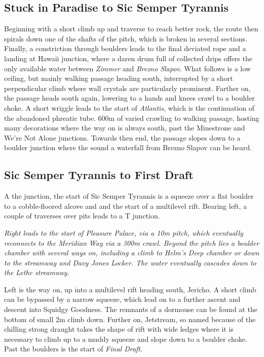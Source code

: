 \subsection{Stuck in Paradise to Sic Semper Tyrannis}
Beginning with a short climb up and traverse to reach better rock, the route then spirals down one of the shafts of the pitch, which is broken in several sections. Finally, a constriction through boulders leads to the final deviated rope and a landing at Hawaii junction, where a daren drum full of collected drips offers the only available water between \emph{Zimmer} and \emph{Brezno Slapov}. What follows is a low ceiling, but mainly walking passage heading south, interrupted by a short perpendicular climb where wall crystals are particularly prominent. Farther on, the passage heads south again, lowering to a hands and knees crawl to a boulder choke. A short wriggle leads to the start of \emph{Atlantis}, which is the continuation of the abandoned phreatic tube. 600m of varied crawling to walking passage, hosting many decorations  where the way on is always south, past the Minestrone and We're Not Alone junctions. Towards then end, the passage slopes down to a boulder junction where the sound a waterfall from Brezno Slapov can be heard. 

\subsection{Sic Semper Tyrannis to First Draft}
A the junction, the start of Sic Semper Tyrannis is a squeeze over a flat boulder to a cobble-floored alcove and and the start of a multilevel rift. Bearing left, a couple of traverses over pits leads to a T junction. 

\textit{Right leads to the start of \emph{Pleasure Palace}, via a 10m pitch, which eventually reconnects to the \emph{Meridian Way} via a 300m crawl. Beyond the pitch lies a boulder chamber with several ways on, including a climb to \emph{Helm's Deep} chamber or down to the streamway and \emph{Davy Jones Locker}. The water eventually cascades down to the \emph{Lethe} streamway.}

Left is the way on, up into a multilevel rift heading south, Jericho. A short climb can be bypassed by a narrow squeeze, which lead on to a further ascent and descent into Squidgy Goodness. The remnants of a dormouse can be found at the bottom of small 2m climb down. Further on, Jetstream, so named because of the chilling strong draught takes the shape of rift with wide ledges where it is necessary to climb up to a muddy squeeze and slope down to a boulder choke. Past the boulders is the start of \emph{Final Draft}.

